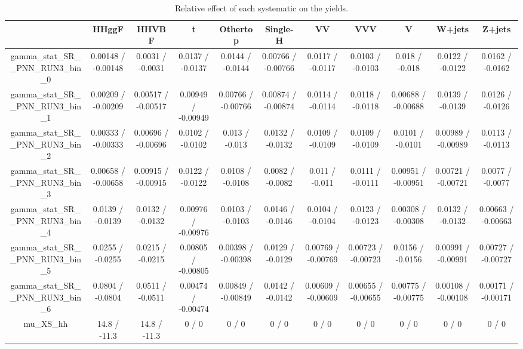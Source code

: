 \documentclass[10pt]{article}
\begin{document}
\begin{table}[htbp]
\begin{center}
\begin{tabular}{|c|c|c|c|c|c|c|c|c|c|c|}
\hline 
      & HHggF      & HHVBF      & t      & Othertop      & Single-H      & VV      & VVV      & V      & W+jets      & Z+jets \\ 
\hline 
  gamma_stat_SR__PNN_RUN3_bin_0 & 0.00148 / -0.00148 & 0.0031 / -0.0031 & 0.0137 / -0.0137 & 0.0144 / -0.0144 & 0.00766 / -0.00766 & 0.0117 / -0.0117 & 0.0103 / -0.0103 & 0.018 / -0.018 & 0.0122 / -0.0122 & 0.0162 / -0.0162 \\ 
  gamma_stat_SR__PNN_RUN3_bin_1 & 0.00209 / -0.00209 & 0.00517 / -0.00517 & 0.00949 / -0.00949 & 0.00766 / -0.00766 & 0.00874 / -0.00874 & 0.0114 / -0.0114 & 0.0118 / -0.0118 & 0.00688 / -0.00688 & 0.0139 / -0.0139 & 0.0126 / -0.0126 \\ 
  gamma_stat_SR__PNN_RUN3_bin_2 & 0.00333 / -0.00333 & 0.00696 / -0.00696 & 0.0102 / -0.0102 & 0.013 / -0.013 & 0.0132 / -0.0132 & 0.0109 / -0.0109 & 0.0109 / -0.0109 & 0.0101 / -0.0101 & 0.00989 / -0.00989 & 0.0113 / -0.0113 \\ 
  gamma_stat_SR__PNN_RUN3_bin_3 & 0.00658 / -0.00658 & 0.00915 / -0.00915 & 0.0122 / -0.0122 & 0.0108 / -0.0108 & 0.0082 / -0.0082 & 0.011 / -0.011 & 0.0111 / -0.0111 & 0.00951 / -0.00951 & 0.00721 / -0.00721 & 0.0077 / -0.0077 \\ 
  gamma_stat_SR__PNN_RUN3_bin_4 & 0.0139 / -0.0139 & 0.0132 / -0.0132 & 0.00976 / -0.00976 & 0.0103 / -0.0103 & 0.0146 / -0.0146 & 0.0104 / -0.0104 & 0.0123 / -0.0123 & 0.00308 / -0.00308 & 0.0132 / -0.0132 & 0.00663 / -0.00663 \\ 
  gamma_stat_SR__PNN_RUN3_bin_5 & 0.0255 / -0.0255 & 0.0215 / -0.0215 & 0.00805 / -0.00805 & 0.00398 / -0.00398 & 0.0129 / -0.0129 & 0.00769 / -0.00769 & 0.00723 / -0.00723 & 0.0156 / -0.0156 & 0.00991 / -0.00991 & 0.00727 / -0.00727 \\ 
  gamma_stat_SR__PNN_RUN3_bin_6 & 0.0804 / -0.0804 & 0.0511 / -0.0511 & 0.00474 / -0.00474 & 0.00849 / -0.00849 & 0.0142 / -0.0142 & 0.00609 / -0.00609 & 0.00655 / -0.00655 & 0.00775 / -0.00775 & 0.00108 / -0.00108 & 0.00171 / -0.00171 \\ 
  mu_XS_hh & 14.8 / -11.3 & 14.8 / -11.3 & 0 / 0 & 0 / 0 & 0 / 0 & 0 / 0 & 0 / 0 & 0 / 0 & 0 / 0 & 0 / 0 \\ 
\hline 
\end{tabular} 
\caption{Relative effect of each systematic on the yields.} 
\end{center} 
\end{table} 
\end{document}

